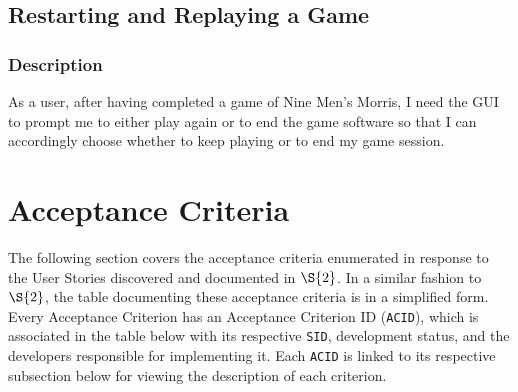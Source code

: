 \documentclass[11pt]{article}
\begin{document}
\subsection{Restarting and Replaying a Game}
\label{sec:org13702bc}
\subsubsection*{Description}
\label{sec:org2b9bb52}
As a user, after having completed a game of Nine Men's Morris, I need the GUI to prompt me to
either play again or to end the game software so that I can accordingly choose whether to keep
playing or to end my game session.
\section{Acceptance Criteria}
\label{sec:org469b4b7}
The following section covers the acceptance criteria enumerated in response to the User Stories
discovered and documented in \hyperref[sec:orgeab8e19]{\(\S{2}\)}. In a similar fashion to \(\S{2}\), the table documenting these
acceptance criteria is in a simplified form. Every Acceptance Criterion has an Acceptance
Criterion ID (\texttt{ACID}), which is associated in the table below with its respective \texttt{SID}, development
status, and the developers responsible for implementing it. Each \texttt{ACID} is linked to its respective
subsection below for viewing the description of each criterion.
\end{document}
